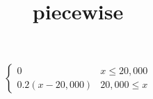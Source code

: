 \usepackage{amsmath}
\title{piecewise}

\[ \begin{cases}
      0 & x\leq 20,000 \\
      {0.2} (x - 20,000) & 20,000\leq x
   \end{cases}
\]
